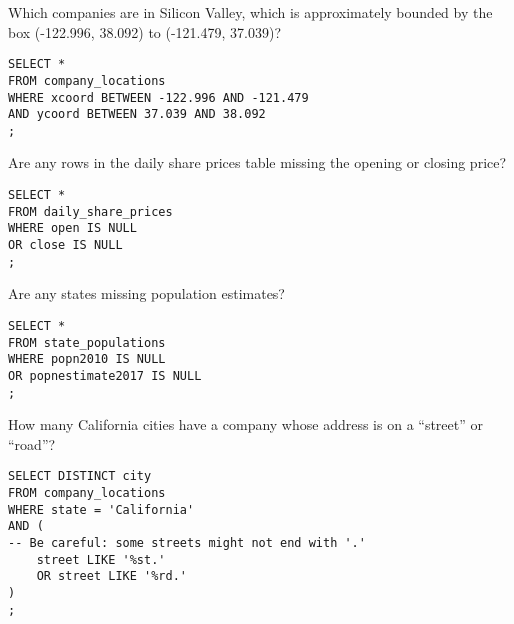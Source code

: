 \documentclass[10pt]{exam}
\begin{document}
\begin{questions}
\question Which companies are in Silicon Valley, which is approximately bounded
by the box (-122.996, 38.092) to (-121.479, 37.039)?

\begin{solution}
\begin{lstlisting}
SELECT *
FROM company_locations
WHERE xcoord BETWEEN -122.996 AND -121.479
AND ycoord BETWEEN 37.039 AND 38.092
;
\end{lstlisting}
\end{solution}


\question Are any rows in the daily share prices table missing the opening or
closing price?

\begin{solution}
\begin{lstlisting}
SELECT *
FROM daily_share_prices
WHERE open IS NULL
OR close IS NULL
;
\end{lstlisting}
\end{solution}


\question Are any states missing population estimates?

\begin{solution}
\begin{lstlisting}
SELECT *
FROM state_populations
WHERE popn2010 IS NULL
OR popnestimate2017 IS NULL
;
\end{lstlisting}
\end{solution}


\question How many California cities have a company whose address is on a
``street'' or ``road''?

\begin{solution}
\begin{lstlisting}
SELECT DISTINCT city
FROM company_locations
WHERE state = 'California'
AND (
-- Be careful: some streets might not end with '.'
	street LIKE '%st.'
	OR street LIKE '%rd.'
)
;
\end{lstlisting}
\end{solution}

\end{questions}
\end{document}
